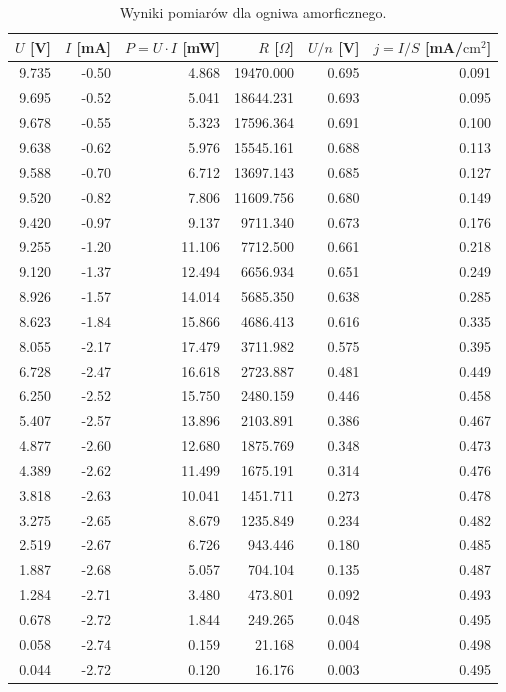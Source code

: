 \documentclass{fizykalab}
\begin{document}
\begin{table}[H]
    \centering
    \caption{Wyniki pomiarów dla ogniwa amorficznego.}
\begin{tabular}{rrrrrr}
\toprule
$U$ [V] & $I$ [mA] & $P = U \cdot I$ [mW] & $R$ [$\Omega$] & $U/n$ [V] & $j=I/S$ [mA/$\text{cm}^2$] \\
\midrule
9.735 & -0.50 & 4.868 & 19470.000 & 0.695 & 0.091 \\
9.695 & -0.52 & 5.041 & 18644.231 & 0.693 & 0.095 \\
9.678 & -0.55 & 5.323 & 17596.364 & 0.691 & 0.100 \\
9.638 & -0.62 & 5.976 & 15545.161 & 0.688 & 0.113 \\
9.588 & -0.70 & 6.712 & 13697.143 & 0.685 & 0.127 \\
9.520 & -0.82 & 7.806 & 11609.756 & 0.680 & 0.149 \\
9.420 & -0.97 & 9.137 & 9711.340 & 0.673 & 0.176 \\
9.255 & -1.20 & 11.106 & 7712.500 & 0.661 & 0.218 \\
9.120 & -1.37 & 12.494 & 6656.934 & 0.651 & 0.249 \\
8.926 & -1.57 & 14.014 & 5685.350 & 0.638 & 0.285 \\
8.623 & -1.84 & 15.866 & 4686.413 & 0.616 & 0.335 \\
8.055 & -2.17 & 17.479 & 3711.982 & 0.575 & 0.395 \\
6.728 & -2.47 & 16.618 & 2723.887 & 0.481 & 0.449 \\
6.250 & -2.52 & 15.750 & 2480.159 & 0.446 & 0.458 \\
5.407 & -2.57 & 13.896 & 2103.891 & 0.386 & 0.467 \\
4.877 & -2.60 & 12.680 & 1875.769 & 0.348 & 0.473 \\
4.389 & -2.62 & 11.499 & 1675.191 & 0.314 & 0.476 \\
3.818 & -2.63 & 10.041 & 1451.711 & 0.273 & 0.478 \\
3.275 & -2.65 & 8.679 & 1235.849 & 0.234 & 0.482 \\
2.519 & -2.67 & 6.726 & 943.446 & 0.180 & 0.485 \\
1.887 & -2.68 & 5.057 & 704.104 & 0.135 & 0.487 \\
1.284 & -2.71 & 3.480 & 473.801 & 0.092 & 0.493 \\
0.678 & -2.72 & 1.844 & 249.265 & 0.048 & 0.495 \\
0.058 & -2.74 & 0.159 & 21.168 & 0.004 & 0.498 \\
0.044 & -2.72 & 0.120 & 16.176 & 0.003 & 0.495 \\
\bottomrule
\end{tabular}
\end{table}
\end{document}
